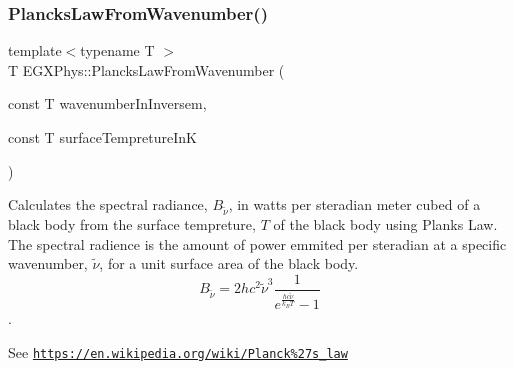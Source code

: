 \mbox{\label{group___e_g_x_phys-_electrodynamics-_black_body-_plancks_law_ga6648ae2a0fbff6735c1e1a04c7cac746}} 
\subsubsection{\texorpdfstring{Plancks\+Law\+From\+Wavenumber()}{PlancksLawFromWavenumber()}}
{\footnotesize\ttfamily template$<$typename T $>$ \\
T E\+G\+X\+Phys\+::\+Plancks\+Law\+From\+Wavenumber (\begin{DoxyParamCaption}\item[{const T}]{wavenumber\+In\+Inversem,  }\item[{const T}]{surface\+Tempreture\+InK }\end{DoxyParamCaption})}



Calculates the spectral radiance, $B_{\tilde {\nu }}$, in watts per steradian meter cubed of a black body from the surface tempreture, $T$ of the black body using Plank\textquotesingle{}s Law. The spectral radience is the amount of power emmited per steradian at a specific wavenumber, $\tilde {\nu }$, for a unit surface area of the black body. \[ B_{\tilde {\nu }} = 2 h c^2 \tilde {\nu }^3 \dfrac{1}{e^{\frac{hc \tilde {\nu }}{k_B T}} - 1} \]. 

See \href{https://en.wikipedia.org/wiki/Planck%27s_law}{\tt https\+://en.\+wikipedia.\+org/wiki/\+Planck\%27s\+\_\+law}


